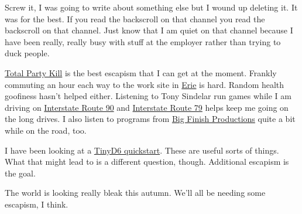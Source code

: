 Screw it, I was going to write about something else but I wound up
deleting it. It was for the best. If you read the backscroll on that
channel you read the backscroll on that channel. Just know that I am
quiet on that channel because I have been really, really busy with stuff
at the employer rather than trying to duck people.

\href{https://www.theincomparable.com/tpk/}{Total Party Kill} is the
best escapism that I can get at the moment. Frankly commuting an hour
each way to the work site in
\href{https://simple.wikipedia.org/w/index.php?title=Erie,_Pennsylvania&oldid=9061305}{Erie}
is hard. Random health goofiness hasn't helped either. Listening to Tony
Sindelar run games while I am driving on
\href{https://simple.wikipedia.org/w/index.php?title=Interstate_90&oldid=8969887}{Interstate
Route 90} and
\href{https://simple.wikipedia.org/w/index.php?title=Interstate_79&oldid=5516605}{Interstate
Route 79} helps keep me going on the long drives. I also listen to
programs from
\href{https://en.wikipedia.org/w/index.php?title=Big_Finish_Productions&oldid=1179492428}{Big
Finish Productions} quite a bit while on the road, too.

I have been looking at a
\href{https://www.drivethrurpg.com/product/232269/Mad-Magicks-of-the-Turned-God-A-Tiny-Dungeon-2e-Quickstart}{TinyD6
quickstart}. These are useful sorts of things. What that might lead to
is a different question, though. Additional escapism is the goal.

The world is looking really bleak this autumn. We'll all be needing some
escapism, I think.
